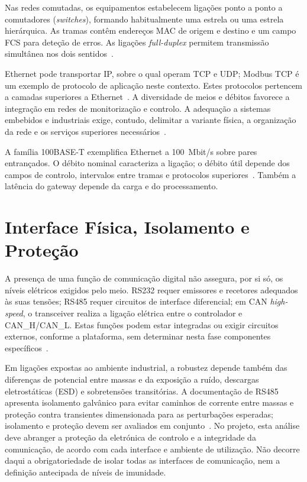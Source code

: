 Nas redes comutadas, os equipamentos estabelecem ligações ponto a ponto
a comutadores (\textit{switches}), formando habitualmente uma estrela
ou uma estrela hierárquica. As tramas contêm endereços MAC de origem e
destino e um campo FCS para deteção de erros. As ligações
\textit{full-duplex} permitem transmissão simultânea nos dois
sentidos~\cite{simmons_ethernet_2008}.

Ethernet pode transportar IP, sobre o qual operam TCP e UDP;
Modbus TCP é um exemplo de protocolo de aplicação neste contexto.
Estes protocolos pertencem a camadas superiores a
Ethernet~\cite{simmons_ethernet_2008,modbus_specifications}.
A diversidade de meios e débitos favorece a integração em redes de
monitorização e controlo. A adequação a sistemas embebidos e industriais
exige, contudo, delimitar a variante física, a organização da rede e
os serviços superiores necessários~\cite{ieee_8023_2018,simmons_ethernet_2008}.

A família 100BASE-T exemplifica Ethernet a 100~Mbit/s sobre pares
entrançados. O débito nominal caracteriza a ligação; o débito útil
depende dos campos de controlo, intervalos entre tramas e protocolos
superiores~\cite{simmons_ethernet_2008}. Também a latência do gateway
depende da carga e do processamento.

\section{Interface Física, Isolamento e Proteção}

A presença de uma função de comunicação digital não assegura, por si só,
os níveis elétricos exigidos pelo meio. RS232 requer emissores e recetores
adequados às suas tensões; RS485 requer circuitos de interface diferencial;
em CAN \textit{high-speed}, o transceiver realiza a ligação elétrica entre
o controlador e CAN\_H/CAN\_L. Estas funções podem estar integradas ou
exigir circuitos externos, conforme a plataforma, sem determinar nesta
fase componentes específicos~\cite{dodson_rs232_2023,ti_rs485_an1057_2013,cia_can_hs}.

Em ligações expostas ao ambiente industrial, a robustez depende também
das diferenças de potencial entre massas e da exposição a ruído,
descargas eletrostáticas (ESD) e sobretensões transitórias. A documentação
de RS485 apresenta isolamento galvânico para evitar caminhos de corrente
entre massas e proteção contra transientes dimensionada para as
perturbações esperadas; isolamento e proteção devem ser avaliados em
conjunto~\cite[secs.~1 e~6]{viviano_rs485_isolation_2018}.
No projeto, esta análise deve abranger a proteção da eletrónica de
controlo e a integridade da comunicação, de acordo com cada interface
e ambiente de utilização. Não decorre daqui a obrigatoriedade de isolar
todas as interfaces de comunicação, nem a definição antecipada de níveis
de imunidade.


